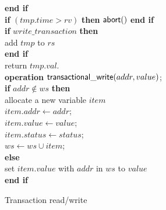 \documentclass[11pt]{article}
\begin{document}
\begin{figure}[htb]
{{\begin{minipage}[t]{150mm}
\begin{tabbing}
 \> {\bf end if} \\

 \> {\bf if} $(tmp.time > rv)$ {\bf then} ${\sf abort}()$ {\bf end if} \\
 \> {\bf if} $write\_transaction$ {\bf then} \\
 \>\> add $tmp$ to $rs$ \\
 \> {\bf end if} \\
 \> {\sf return} $tmp.val$. \\


{\bf operation}  ${\sf transactional\_write}(addr, value)$;\\
 \> {\bf if} $addr \not\in ws$ {\bf then} \\
 \>\> allocate a new variable $item$ \\
 \>\> $item.addr \gets addr$; \\
 \>\> $item.value \gets value$; \\
 \>\> $item.status \gets status$; \\
 \>\> $ws \gets ws \cup item$; \\
 \> {\bf else} \\
 \>\> set $item.value$ with $addr$ in $ws$ to $value$ \\
 \> {\bf end if} \\



\end{tabbing}
\normalsize
\end{minipage}
}
\caption{Transaction read/write}
\label{fig-prevent-looping}
}
\end{figure}
\end{document}
